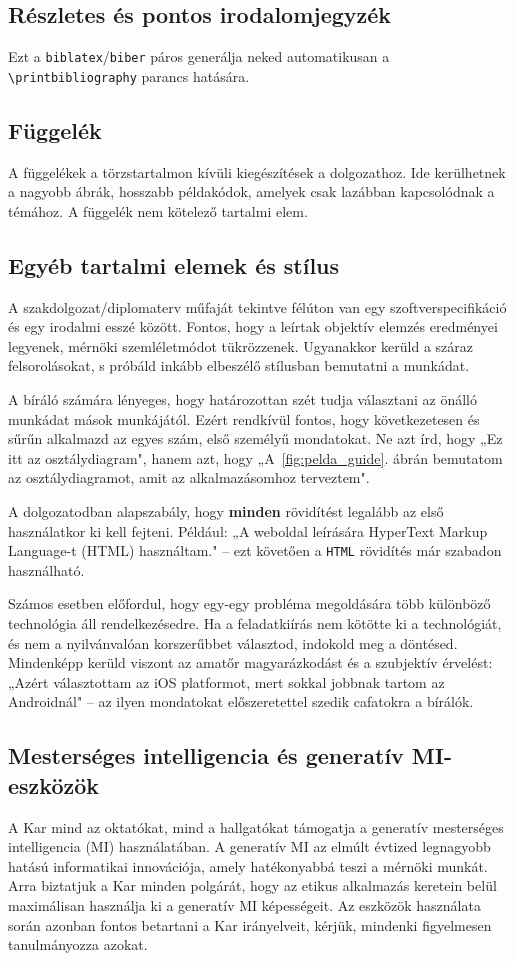 \documentclass{sapientia-thesis}
\begin{document}
\subsection{Részletes és pontos irodalomjegyzék}
Ezt a \texttt{biblatex}/\texttt{biber} páros generálja neked automatikusan a \verb|\printbibliography| parancs hatására.

\subsection{Függelék}
A függelékek a törzstartalmon kívüli kiegészítések a dolgozathoz. Ide kerülhetnek a nagyobb ábrák, hosszabb példakódok, amelyek csak lazábban kapcsolódnak a témához. A függelék nem kötelező tartalmi elem.

\subsection{Egyéb tartalmi elemek és stílus}
A szakdolgozat/diplomaterv műfaját tekintve félúton van egy szoftverspecifikáció és egy irodalmi esszé között. Fontos, hogy a leírtak objektív elemzés eredményei legyenek, mérnöki szemléletmódot tükrözzenek. Ugyanakkor kerüld a száraz felsorolásokat, s próbáld inkább elbeszélő stílusban bemutatni a munkádat.

A bíráló számára lényeges, hogy határozottan szét tudja választani az önálló munkádat mások munkájától. Ezért rendkívül fontos, hogy következetesen és sűrűn alkalmazd az egyes szám, első személyű mondatokat. Ne azt írd, hogy „Ez itt az osztálydiagram", hanem azt, hogy „A~\ref{fig:pelda_guide}. ábrán bemutatom az osztálydiagramot, amit az alkalmazásomhoz terveztem".

A dolgozatodban alapszabály, hogy \textbf{minden} rövidítést legalább az első használatkor ki kell fejteni. Például: „A weboldal leírására HyperText Markup Language-t (HTML) használtam." -- ezt követően a \texttt{HTML} rövidítés már szabadon használható.

Számos esetben előfordul, hogy egy-egy probléma megoldására több különböző technológia áll rendelkezésedre. Ha a feladatkiírás nem kötötte ki a technológiát, és nem a nyilvánvalóan korszerűbbet választod, indokold meg a döntésed. Mindenképp kerüld viszont az amatőr magyarázkodást és a szubjektív érvelést: „Azért választottam az iOS platformot, mert sokkal jobbnak tartom az Androidnál" -- az ilyen mondatokat előszeretettel szedik cafatokra a bírálók.

\subsection{Mesterséges intelligencia és generatív MI-eszközök}
A Kar mind az oktatókat, mind a hallgatókat támogatja a generatív mesterséges intelligencia (MI) használatában. A generatív MI az elmúlt évtized legnagyobb hatású informatikai innovációja, amely hatékonyabbá teszi a mérnöki munkát. Arra biztatjuk a Kar minden polgárát, hogy az etikus alkalmazás keretein belül maximálisan használja ki a generatív MI képességeit. Az eszközök használata során azonban fontos betartani a Kar irányelveit, kérjük, mindenki figyelmesen tanulmányozza azokat.
\end{document}
